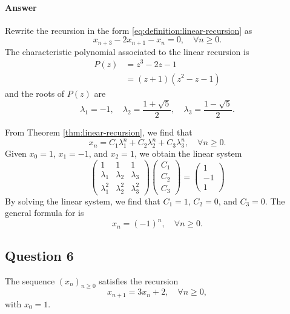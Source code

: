 \paragraph{Answer}
Rewrite the recursion in the form \eqref{eq:definition:linear-recursion} as
\begin{equation*}
    x_{n + 3} - 2 x_{n + 1} - x_n = 0, \quad \forall n \geq 0.
\end{equation*}
The characteristic polynomial associated to the linear recursion is
\begin{align*}
    P(z) &= z^3 - 2z - 1 \\
         &= (z + 1)(z^2 - z - 1)
\end{align*}
and the roots of $ P(z) $ are
\begin{equation*}
    \lambda_1 = -1, \quad \lambda_2 = \frac{1 + \sqrt{5}}{2}, \quad \lambda_3 = \frac{1 - \sqrt{5}}{2}.
\end{equation*}

From Theorem \ref{thm:linear-recursion}, we find that
\begin{equation*}
    x_n = C_1 \lambda_1^n + C_2 \lambda_2^n + C_3 \lambda_3^n, \quad \forall n \geq 0.
\end{equation*}
Given $ x_0 = 1 $, $ x_1 = -1 $, and $ x_2 = 1 $, we obtain the linear system
\begin{equation*}
    \begin{pmatrix}
        1 & 1 & 1 \\
        \lambda_1 & \lambda_2 & \lambda_3 \\
        \lambda_1^2 & \lambda_2^2 & \lambda_3^2
    \end{pmatrix}
    \begin{pmatrix}
        C_1 \\
        C_2 \\
        C_3
    \end{pmatrix}
    =
    \begin{pmatrix}
        1 \\
        -1 \\
        1
    \end{pmatrix}
\end{equation*}
By solving the linear system, we find that $ C_1 = 1 $, $ C_2 = 0 $, and $ C_3 = 0 $.
The general formula for is
\begin{equation*}
    x_n = (-1)^n, \quad \forall n \geq 0.
\end{equation*}

\subsection{Question 6}
The sequence $ (x_n)_{n \geq 0} $ satisfies the recursion
\begin{equation*}
    x_{n + 1} = 3 x_n + 2, \quad \forall n \geq 0,
\end{equation*}
with $ x_0 = 1 $.

